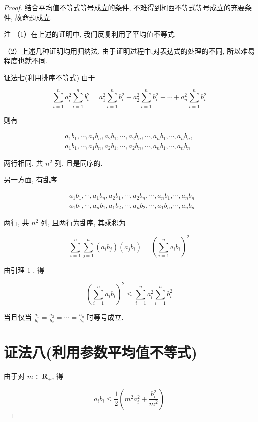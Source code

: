 \begin{proof}
	结合平均值不等式等号成立的条件, 不难得到柯西不等式等号成立的充要条件, 故命题成立.
	
	注 （1）在上述的证明中, 我们反复利用了平均值不等式.
	
	（2）上述几种证明均用归纳法, 由于证明过程中,对表达式的处理的不同, 所以难易程度也就不同.
	
	证法七(利用排序不等式) 由于
	
	$$
	\sum_{i=1}^{n} a_{i}^{2} \sum_{i=1}^{n} b_{i}^{2}=a_{1}^{2} \sum_{i=1}^{n} b_{i}^{2}+a_{2}^{2} \sum_{i=1}^{n} b_{i}^{2}+\cdots+a_{n}^{2} \sum_{i=1}^{n} b_{i}^{2}
	$$
	
	则有
	
	$$
	\begin{gathered}
	a_{1} b_{1}, \cdots, a_{1} b_{n}, a_{2} b_{1}, \cdots, a_{2} b_{n}, \cdots, a_{n} b_{1}, \cdots, a_{n} b_{n}, \\
	a_{1} b_{1}, \cdots, a_{1} b_{n}, a_{2} b_{1}, \cdots, a_{2} b_{n}, \cdots, a_{n} b_{1}, \cdots, a_{n} b_{n}
	\end{gathered}
	$$
	
	两行相同, 共 $n^{2}$ 列, 且是同序的.
	
	另一方面, 有乱序
	
	$$
	\begin{aligned}
	& a_{1} b_{1}, \cdots, a_{1} b_{n}, a_{2} b_{1}, \cdots, a_{2} b_{n}, \cdots, a_{n} b_{1}, \cdots, a_{n} b_{n} \\
	& a_{1} b_{1}, \cdots, a_{n} b_{1}, a_{1} b_{2}, \cdots, a_{n} b_{2}, \cdots, a_{1} b_{n}, \cdots, a_{n} b_{n}
	\end{aligned}
	$$
	
	两行, 共 $n^{2}$ 列, 且两行为乱序, 其乘积为
	
	$$
	\sum_{i=1}^{n} \sum_{j=1}^{n}\left(a_{i} b_{j}\right)\left(a_{j} b_{i}\right)=\left(\sum_{i=1}^{n} a_{i} b_{i}\right)^{2}
	$$
	
	由引理 1 , 得
	
	$$
	\left(\sum_{i=1}^{n} a_{i} b_{i}\right)^{2} \leqslant \sum_{i=1}^{n} a_{i}^{2} \sum_{i=1}^{n} b_{i}^{2}
	$$
	
	当且仅当 $\frac{a_{1}}{b_{1}}=\frac{a_{2}}{b_{2}}=\cdots=\frac{a_{n}}{b_{n}}$ 时等号成立.
	
	\section*{证法八(利用参数平均值不等式)}
	由于对 $m \in \mathbf{R}_{+}$, 得
	
	$$
	a_{i} b_{i} \leqslant \frac{1}{2}\left(m^{2} a_{i}^{2}+\frac{b_{i}^{2}}{m^{2}}\right)
	$$
	

\end{proof}

